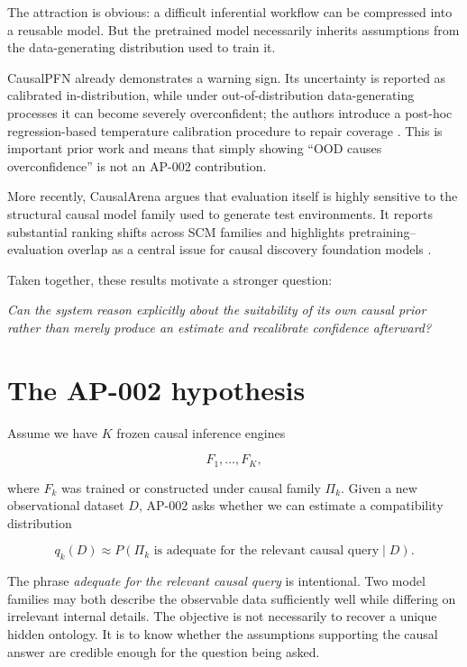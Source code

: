 \documentclass[11pt]{article}
\begin{document}
The attraction is obvious: a difficult inferential workflow can be compressed into a reusable model. But the pretrained model necessarily inherits assumptions from the data-generating distribution used to train it.

CausalPFN already demonstrates a warning sign. Its uncertainty is reported as calibrated in-distribution, while under out-of-distribution data-generating processes it can become severely overconfident; the authors introduce a post-hoc regression-based temperature calibration procedure to repair coverage \cite{balazadeh2025}. This is important prior work and means that simply showing ``OOD causes overconfidence'' is not an AP-002 contribution.

More recently, CausalArena argues that evaluation itself is highly sensitive to the structural causal model family used to generate test environments. It reports substantial ranking shifts across SCM families and highlights pretraining--evaluation overlap as a central issue for causal discovery foundation models \cite{li2026}.

Taken together, these results motivate a stronger question:

\begin{center}
\emph{Can the system reason explicitly about the suitability of its own causal prior rather than merely produce an estimate and recalibrate confidence afterward?}
\end{center}

\section{The AP-002 hypothesis}

Assume we have $K$ frozen causal inference engines

\begin{equation}
F_1,\ldots,F_K,
\end{equation}

where $F_k$ was trained or constructed under causal family $\Pi_k$. Given a new observational dataset $D$, AP-002 asks whether we can estimate a compatibility distribution

\begin{equation}
q_k(D)\approx P(\Pi_k\text{ is adequate for the relevant causal query}\mid D).
\end{equation}

The phrase \emph{adequate for the relevant causal query} is intentional. Two model families may both describe the observable data sufficiently well while differing on irrelevant internal details. The objective is not necessarily to recover a unique hidden ontology. It is to know whether the assumptions supporting the causal answer are credible enough for the question being asked.
\end{document}
